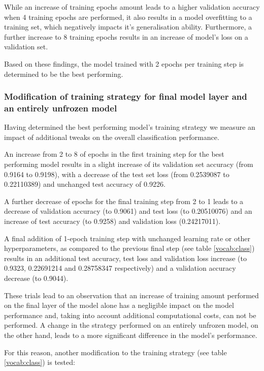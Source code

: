 While an increase of training epochs amount leads to a higher validation accuracy when 4 training epochs are performed, it also results in a model overfitting to a training set, which negatively impacts it's generalisation ability. Furthermore, a further increase to 8 training epochs results in an increase of model's loss on a validation set. 

Based on these findings, the model trained with 2 epochs per training step is determined to be the best performing.

\subsubsection{Modification of training strategy for final model layer and an entirely unfrozen model}

Having determined the best performing model's training strategy we measure an impact of additional tweaks on the overall classification performance.

An increase from 2 to 8 of epochs in the first training step for the best performing model results in a slight increase of its validation set accuracy (from 0.9164 to 0.9198), with a decrease of the test set loss (from 0.2539087 to 0.22110389) and unchanged test accuracy of 0.9226.

A further decrease of epochs for the final training step from 2 to 1 leads to a decrease of validation accuracy (to 0.9061) and test loss (to 0.20510076) and an increase of test accuracy (to 0.9258) and validation loss (0.24217011). 

A final addition of 1-epoch training step with unchanged learning rate or other hyperparameters, as compared to the previous final step (see table \ref{vocab:class}) results in an additional test accuracy, test loss and validation loss increase (to 0.9323, 0.22691214 and 0.28758347 respectively) and a validation accuracy decrease (to 0.9044). 

These trials lead to an observation that an increase of training amount performed on the final layer of the model alone has a negligible impact on the model performance and, taking into account additional computational costs, can not be performed. A change in the strategy performed on an entirely unfrozen model, on the other hand, leads to a more significant difference in the model's performance.

For this reason, another modification to the training strategy (see table \ref{vocab:class}) is tested:

